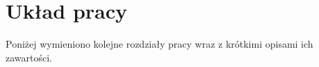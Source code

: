 \section{Układ pracy}

Poniżej wymieniono kolejne rozdziały pracy wraz z krótkimi opisami ich zawartości.

\begin{comment}
W kolejnym rozdziale niniejszej pracy przedstawiono wybrane z istniejących platform (?). W trzecim rozdziale zawarto koncept rozwiązania. Czwarty rozdział obejmuje projekt systemu. Piąty rozdział przybliża architekturę systemu oraz technologie wybrane do jego budowy. W następnym, szóstym, rozdziale

O układzie pracy, przejście od przeglądu rozwiązań poprzez koncept, projekt techniczny aż do szczegółów implementacji oraz jej walidacji środowiskowej.

Następny rozdział niniejszej pracy zawiera przegląd istniejących platform, które realizują podobne cele do projektowanego systemu. Kolejne rozdziały dotyczą projektowanego systemu. W trzecim rozdziale zawarto projekt konceptualny. Czwarty rozdział obejmuje projekt techniczny systemu. W piątym rozdziale przybliżono 

\end{comment}

